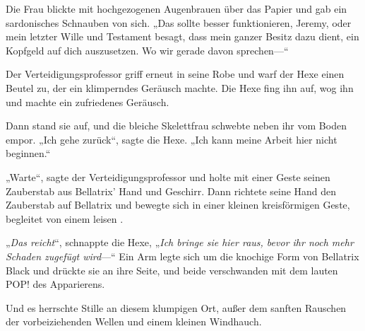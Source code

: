 Die Frau blickte mit hochgezogenen Augenbrauen über das Papier und gab ein sardonisches Schnauben von sich.
„Das sollte besser funktionieren, Jeremy, oder mein letzter Wille und Testament besagt, dass mein ganzer Besitz dazu dient, ein Kopfgeld auf dich auszusetzen. Wo wir gerade davon sprechen—“

Der Verteidigungsprofessor griff erneut in seine Robe und warf der Hexe einen Beutel zu, der ein klimperndes Geräusch machte. Die Hexe fing ihn auf, wog ihn und machte ein zufriedenes Geräusch.

Dann stand sie auf, und die bleiche Skelettfrau schwebte neben ihr vom Boden empor.
„Ich gehe zurück“, sagte die Hexe.
„Ich kann meine Arbeit hier nicht beginnen.“

„Warte“, sagte der Verteidigungsprofessor und holte mit einer Geste seinen Zauberstab aus Bellatrix’ Hand und Geschirr. Dann richtete seine Hand den Zauberstab auf Bellatrix und bewegte sich in einer kleinen kreisförmigen Geste, begleitet von einem leisen .

„\emph{Das reicht}“, schnappte die Hexe, „\emph{Ich bringe sie hier raus, bevor ihr noch mehr Schaden zugefügt wird}—“ Ein Arm legte sich um die knochige Form von Bellatrix Black und drückte sie an ihre Seite, und beide verschwanden mit dem lauten POP! des Apparierens.

Und es herrschte Stille an diesem klumpigen Ort, außer dem sanften Rauschen der vorbeiziehenden Wellen und einem kleinen Windhauch.

